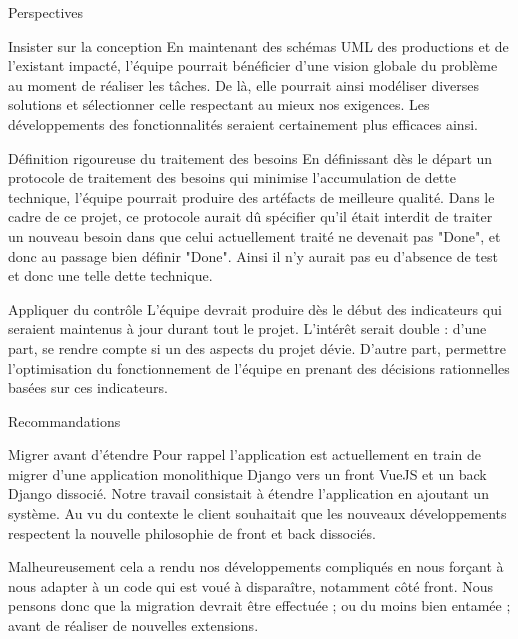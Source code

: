 \documentclass[]{article}
\begin{document}
{\begin{section}{Perspectives}
 \begin{subsection}{Insister sur la conception}
     En maintenant des schémas UML des productions et de l'existant impacté, l'équipe pourrait bénéficier d'une vision globale du problème au moment de réaliser les tâches. De là, elle pourrait ainsi modéliser diverses solutions et sélectionner celle respectant au mieux nos exigences. Les développements des fonctionnalités seraient certainement plus efficaces ainsi.
 \end{subsection}

 \begin{subsection}{Définition rigoureuse du traitement des besoins}
     En définissant dès le départ un protocole de traitement des besoins qui minimise l'accumulation de dette technique, l'équipe pourrait produire des artéfacts de meilleure qualité. Dans le cadre de ce projet, ce protocole aurait dû spécifier qu'il était interdit de traiter un nouveau besoin dans que celui actuellement traité ne devenait pas "Done", et donc au passage bien définir "Done". Ainsi il n'y aurait pas eu d'absence de test et donc une telle dette technique.
 \end{subsection}

 \begin{subsection}{Appliquer du contrôle}
     L'équipe devrait produire dès le début des indicateurs qui seraient maintenus à jour durant tout le projet. L'intérêt serait double : d'une part, se rendre compte si un des aspects du projet dévie. D'autre part, permettre l'optimisation du fonctionnement de l'équipe en prenant des décisions rationnelles basées sur ces indicateurs.
 \end{subsection}
\end{section}

\begin{section}{Recommandations}
 \begin{subsection}{Migrer avant d'étendre}
     Pour rappel l'application est actuellement en train de migrer d'une application monolithique Django vers un front VueJS et un back Django dissocié. Notre travail consistait à étendre l'application en ajoutant un système. Au vu du contexte le client souhaitait que les nouveaux développements respectent la nouvelle philosophie de front et back dissociés.

     Malheureusement cela a rendu nos développements compliqués en nous forçant à nous adapter à un code qui est voué à disparaître, notamment côté front. Nous pensons donc que la migration devrait être effectuée ; ou du moins bien entamée ; avant de réaliser de nouvelles extensions.
 \end{subsection}


\end{section}}
\end{document}
